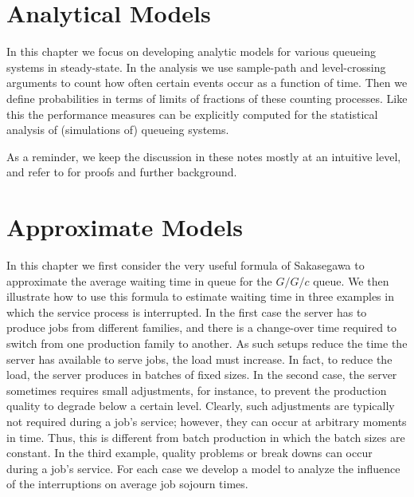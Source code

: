 \chapter{Analytical Models}
\label{cha:analytical-models}

In this chapter we focus on developing analytic models for various queueing systems in steady-state.
In the analysis we use sample-path and level-crossing arguments to count how often certain events occur as a function of time.
Then we define probabilities in terms of limits of fractions of these counting processes.
Like this the performance measures can be explicitly computed for the statistical analysis of (simulations of) queueing systems.


As a reminder, we keep the discussion in these notes mostly at an intuitive level, and refer to \cite{el-taha98:_sampl_path_analy_queuein_system} for proofs and further background.













% 
%



\chapter{Approximate Models}
\label{cha:approximate-models}
In this chapter we first consider the very useful formula of Sakasegawa to approximate the average waiting time in queue for the $G/G/c$ queue.
We then illustrate how to use this formula to estimate waiting time in three examples in which the service process is interrupted.
In the first case the server has to produce jobs from different families, and there is a change-over time required to switch from one production family to another.
As such setups reduce the time the server has available to serve jobs, the load must increase.
In fact, to reduce the load, the server produces in batches of fixed sizes.
In the second case, the server sometimes requires small adjustments, for instance, to prevent the production quality to degrade below a certain level.
Clearly, such adjustments are typically not required during a job's service; however, they can occur at arbitrary moments in time.
Thus, this is different from batch production in which the batch sizes are constant.
In the third example, quality problems or break downs can occur during a job's service.
For each case we develop a model to analyze the influence of the interruptions on average job sojourn times.


